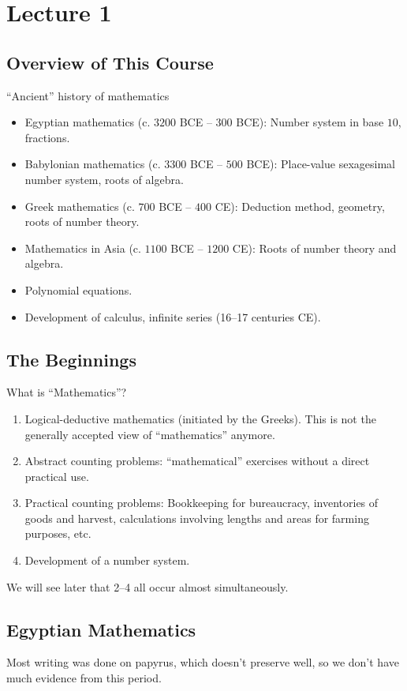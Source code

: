 \documentclass[class=article, crop=false]{standalone}
\begin{document}
  \section{Lecture 1}
  \subsection{Overview of This Course}
  ``Ancient'' history of mathematics
  \begin{itemize}
    \item Egyptian mathematics (c. $3200$ BCE -- $300$ BCE): Number system in base $10$, fractions.
    \item Babylonian mathematics (c. $3300$ BCE -- $500$ BCE): Place-value sexagesimal number system, roots of algebra.
    \item Greek mathematics (c. $700$ BCE -- $400$ CE): Deduction method, geometry, roots of number theory.
    \item Mathematics in Asia (c. $1100$ BCE -- $1200$ CE): Roots of number theory and algebra.
    \item Polynomial equations.
    \item Development of calculus, infinite series (16--17 centuries CE).
  \end{itemize}
  \subsection{The Beginnings}
  What is ``Mathematics''?
  \begin{enumerate}
    \item Logical-deductive mathematics (initiated by the Greeks). This is not the generally accepted view of ``mathematics'' anymore.
    \item Abstract counting problems: ``mathematical'' exercises without a direct practical use.
    \item Practical counting problems: Bookkeeping for bureaucracy, inventories of goods and harvest, calculations involving lengths and areas for farming purposes, etc.
    \item Development of a number system.
  \end{enumerate}
  \begin{note}{}
    We will see later that 2--4 all occur almost simultaneously.
  \end{note}
  \subsection{Egyptian Mathematics}
  Most writing was done on papyrus, which doesn't preserve well, so we don't have much evidence from this period.
\end{document}
